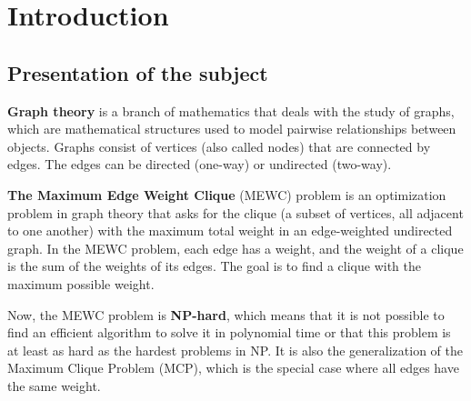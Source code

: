 
\section{Introduction}

\subsection{Presentation of the subject}

\textbf{Graph theory} is a branch of mathematics that deals with the study of graphs,
which are mathematical structures used to model pairwise relationships between
objects. Graphs consist of vertices (also called nodes) that are connected by
edges. The edges can be directed (one-way) or undirected (two-way). \newline

\textbf{The Maximum Edge Weight Clique} (MEWC) problem is an optimization problem
in graph theory that asks for the clique (a subset of vertices, all adjacent to
one another) with the maximum total weight in an edge-weighted undirected graph.
In the MEWC problem, each edge has a weight, and the weight of a clique is the
sum of the weights of its edges. The goal is to find a clique with the maximum
possible weight. \newline

Now, the MEWC problem is \textbf{NP-hard}, which means that it is not possible
to find an efficient algorithm to solve it in polynomial time or that this problem
is at least as hard as the hardest problems in NP. It is also the generalization
of the Maximum Clique Problem (MCP), which is the special case where all edges
have the same weight. \newline


